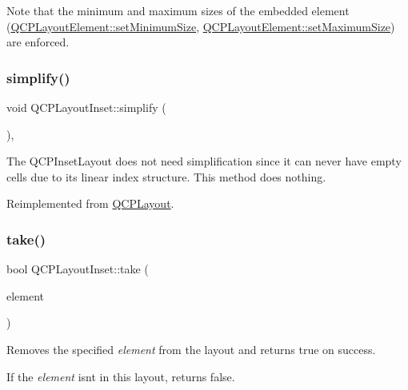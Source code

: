 Note that the minimum and maximum sizes of the embedded element (\hyperlink{class_q_c_p_layout_element_a5dd29a3c8bc88440c97c06b67be7886b}{Q\+C\+P\+Layout\+Element\+::set\+Minimum\+Size}, \hyperlink{class_q_c_p_layout_element_a74eb5280a737ab44833d506db65efd95}{Q\+C\+P\+Layout\+Element\+::set\+Maximum\+Size}) are enforced. \mbox{\label{class_q_c_p_layout_inset_a18b7d508f0baa60cc5dcb1343cf7f32a}} 
\subsubsection{\texorpdfstring{simplify()}{simplify()}}
{\footnotesize\ttfamily void Q\+C\+P\+Layout\+Inset\+::simplify (\begin{DoxyParamCaption}{ }\end{DoxyParamCaption})\hspace{0.3cm}{\ttfamily [inline]}, {\ttfamily [virtual]}}

The Q\+C\+P\+Inset\+Layout does not need simplification since it can never have empty cells due to its linear index structure. This method does nothing. 

Reimplemented from \hyperlink{class_q_c_p_layout_a41e6ac049143866e8f8b4964efab01b2}{Q\+C\+P\+Layout}.

\mbox{\label{class_q_c_p_layout_inset_af7f13cc369f8190b5e7e17d5f39dfe1c}} 
\subsubsection{\texorpdfstring{take()}{take()}}
{\footnotesize\ttfamily bool Q\+C\+P\+Layout\+Inset\+::take (\begin{DoxyParamCaption}\item[{\hyperlink{class_q_c_p_layout_element}{Q\+C\+P\+Layout\+Element} $\ast$}]{element }\end{DoxyParamCaption})\hspace{0.3cm}{\ttfamily [virtual]}}

Removes the specified {\itshape element} from the layout and returns true on success.

If the {\itshape element} isn\textquotesingle{}t in this layout, returns false.


